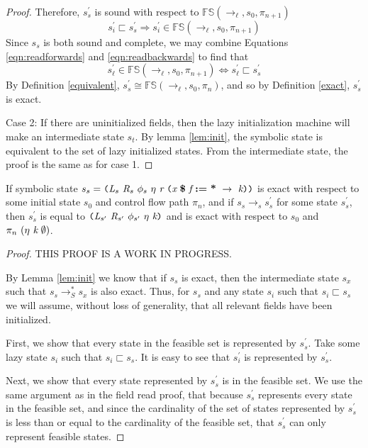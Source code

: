 \begin{proof}
 Therefore, $s_s^\prime$ is sound with respect to $\mathbb{FS}(\rightarrow_{\ell},s_0,\pi_{n+1})$
 \begin{equation}
 \label{eqn:readbackwards}
 s_i^\prime \sqsubset s_s^\prime \Rightarrow s_i^\prime \in \mathbb{FS}(\rightarrow_{\ell},s_0,\pi_{n+1})
 \end{equation}
Since $s_s$ is both sound and complete, we may combine Equations \ref{eqn:readforwards} and \ref{eqn:readbackwards} to find that 
$$s_\ell^\prime \in \mathbb{FS}(\rightarrow_{\ell},s_0,\pi_{n+1}) \Leftrightarrow s_\ell^\prime \sqsubset s_s^\prime$$
By Definition \ref{equivalent}, $s_s^\prime \cong \mathbb{FS}(\rightarrow_{\ell},s_0,\pi_n)$, and so by Definition \ref{exact}, $s_s^\prime$ is exact.

Case 2: If there are uninitialized fields, then the lazy initialization machine will make an intermediate state $s_t$. By lemma \ref{lem:init}, the symbolic state is equivalent to the set of lazy initialized states. From the intermediate state, the proof is the same as for case 1.
\end{proof}

\begin{lemma}
\label{lem:write}
If symbolic state $s_s =  \lp \cfgnt{L}_s\ \cfgnt{R}_s\ \phi_s\ \eta\ \cfgnt{r}\ \lp \cfgnt{x}\ \cfgt{\$}\ \cfgnt{f}\ \cfgt{:=}\ \cfgt{*}\ \rightarrow\ \cfgnt{k}\rp \rp$ is exact with respect to some initial state $s_0$ and control flow path $\pi_n$, and if $s_s \rightarrow_s s_s^\prime$ for some state $s_s^\prime$, then $s_s^\prime$ is equal to $ \lp \cfgnt{L}_{s^\prime}\ \cfgnt{R}_{s^\prime}\ \phi_{s^\prime}\ \eta\ \cfgnt{k}\rp$ and is exact with respect to $s_0$ and $\pi_n \ (\eta\ \cfgnt{k}\ \emptyset)$.

\end{lemma}
\begin{proof}
THIS PROOF IS A WORK IN PROGRESS.

By Lemma \ref{lem:init} we know that if $s_s$ is exact, then the intermediate state $s_x$ such that $s_s \rightarrow_S^* s_x$ is also exact. Thus, for $s_s$ and any state  $s_i$ such that $s_i \sqsubset s_s$ we will assume, without loss of generality, that all relevant fields have been initialized.

First, we show that every state in the feasible set is represented by $s_s^\prime$. Take some lazy state $s_i$ such that $s_i \sqsubset s_s$. It is easy to see that $s_i^\prime$ is represented by $s_s^\prime$. 

Next, we show that every state represented by $s_s^\prime$ is in the feasible set. We use the same argument as in the field read proof, that because $s_s^\prime$ represents every state in the feasible set, and since the cardinality of the set of states represented by $s_s^\prime$ is less than or equal to the cardinality of the feasible set, that $s_s^\prime$ can only represent feasible states.

\end{proof}

